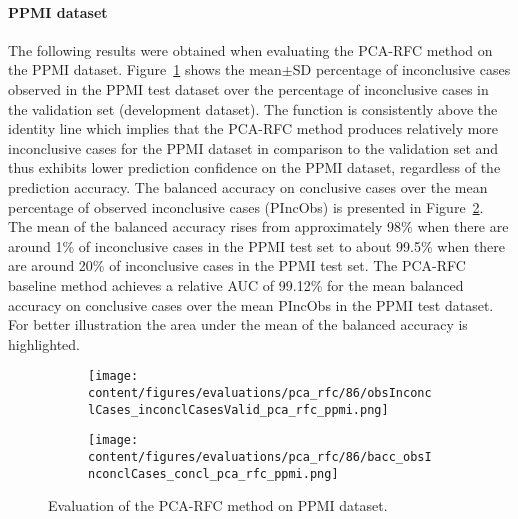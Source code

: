 


\paragraph{PPMI dataset}

The following results were obtained when evaluating the PCA-RFC method on the PPMI dataset.
Figure~\ref{fig:obsInconclCases_inconclCasesValid_pca_rfc_ppmi} shows the
mean$\pm$SD percentage of inconclusive cases observed in the PPMI test dataset 
over the percentage of inconclusive cases in the validation set (development dataset).
The function is consistently above the identity line which implies that the PCA-RFC method 
produces relatively more inconclusive cases for the PPMI dataset  
in comparison to the validation set and thus exhibits lower prediction confidence on the PPMI dataset, 
regardless of the prediction accuracy.
The balanced accuracy on conclusive cases over the mean percentage of observed inconclusive cases (PIncObs) is presented 
in Figure~\ref{fig:bacc_obsInconclCases_concl_pca_rfc_ppmi}.
The mean of the balanced accuracy rises from approximately 98\% 
when there are around 1\% of inconclusive cases in the PPMI test set to about 99.5\% 
when there are around 20\% of inconclusive cases in the PPMI test set.
The PCA-RFC baseline method achieves a relative AUC of 99.12\% for the mean balanced accuracy on conclusive cases 
over the mean PIncObs in the PPMI test dataset.
For better illustration the area under the mean of the balanced accuracy is highlighted.


\begin{figure}[ht]
  \begin{subfigure}{0.9\textwidth}
    \centering
    \texttt{[image: content/figures/evaluations/pca\_rfc/86/obsInconclCases\_inconclCasesValid\_pca\_rfc\_ppmi.png]}
    \label{fig:obsInconclCases_inconclCasesValid_pca_rfc_ppmi}
  \end{subfigure}
  \hfill
  \begin{subfigure}{0.9\textwidth}
    \centering
    \texttt{[image: content/figures/evaluations/pca\_rfc/86/bacc\_obsInconclCases\_concl\_pca\_rfc\_ppmi.png]}
    \label{fig:bacc_obsInconclCases_concl_pca_rfc_ppmi}
  \end{subfigure}
  \caption{Evaluation of the PCA-RFC method on PPMI dataset.}
  \label{fig:perf_results_rfc_ppmi}
\end{figure}



